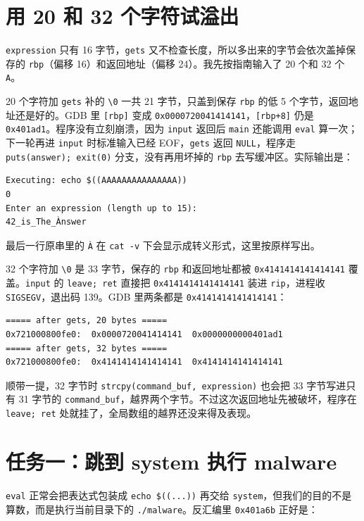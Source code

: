 \documentclass[UTF8,11pt,fontset=fandol]{ctexart}
\newcommand{\code}[1]{\texttt{#1}}
\begin{document}
\section{用 20 和 32 个字符试溢出}

\code{expression} 只有 16 字节，\code{gets} 又不检查长度，所以多出来的字节会依次盖掉保存的 \code{rbp}（偏移 16）和返回地址（偏移 24）。我先按指南输入了 20 个和 32 个 \code{A}。

20 个字符加 \code{gets} 补的 \code{\textbackslash 0} 一共 21 字节，只盖到保存 \code{rbp} 的低 5 个字节，返回地址还是好的。GDB 里 \code{[rbp]} 变成 \code{0x0000720041414141}，\code{[rbp+8]} 仍是 \code{0x401ad1}。程序没有立刻崩溃，因为 \code{input} 返回后 \code{main} 还能调用 \code{eval} 算一次；下一轮再进 \code{input} 时标准输入已经 EOF，\code{gets} 返回 \code{NULL}，程序走 \code{puts(answer); exit(0)} 分支，没有再用坏掉的 \code{rbp} 去写缓冲区。实际输出是：

\begin{lstlisting}
Executing: echo $((AAAAAAAAAAAAAAA))
0
Enter an expression (length up to 15):
42_is_The_Ànswer
\end{lstlisting}

最后一行原串里的 \code{À} 在 \code{cat -v} 下会显示成转义形式，这里按原样写出。

32 个字符加 \code{\textbackslash 0} 是 33 字节，保存的 \code{rbp} 和返回地址都被 \code{0x4141414141414141} 覆盖。\code{input} 的 \code{leave; ret} 直接把 \code{0x4141414141414141} 装进 \code{rip}，进程收 \code{SIGSEGV}，退出码 139。GDB 里两条都是 \code{0x4141414141414141}：

\begin{lstlisting}
===== after gets, 20 bytes =====
0x721000800fe0:  0x0000720041414141  0x0000000000401ad1
===== after gets, 32 bytes =====
0x721000800fe0:  0x4141414141414141  0x4141414141414141
\end{lstlisting}

顺带一提，32 字节时 \code{strcpy(command\_buf, expression)} 也会把 33 字节写进只有 31 字节的 \code{command\_buf}，越界两个字节。不过这次返回地址先被破坏，程序在 \code{leave; ret} 处就挂了，全局数组的越界还没来得及表现。

\section{任务一：跳到 system 执行 malware}

\code{eval} 正常会把表达式包装成 \code{echo \$((...))} 再交给 \code{system}，但我们的目的不是算数，而是执行当前目录下的 \code{./malware}。反汇编里 \code{0x401a6b} 正好是：
\end{document}
